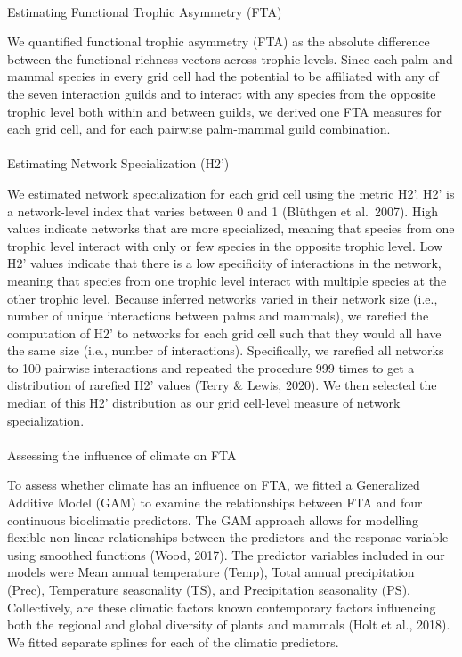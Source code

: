 \documentclass[
]{agujournal2019}
\makeatletter
\let\oldparagraph\paragraph
\renewcommand{\paragraph}{
    \@ifstar
      \xxxParagraphStar
      \xxxParagraphNoStar
  }
\newcommand{\xxxParagraphStar}[1]{\oldparagraph*{#1}\mbox{}}
\newcommand{\xxxParagraphNoStar}[1]{\oldparagraph{#1}\mbox{}}
\makeatother
\begin{document}
\paragraph{Estimating Functional Trophic Asymmetry
(FTA)}\label{estimating-functional-trophic-asymmetry-fta}

We quantified functional trophic asymmetry (FTA) as the absolute
difference between the functional richness vectors across trophic
levels. Since each palm and mammal species in every grid cell had the
potential to be affiliated with any of the seven interaction guilds and
to interact with any species from the opposite trophic level both within
and between guilds, we derived one FTA measures for each grid cell, and
for each pairwise palm-mammal guild combination.

\paragraph{Estimating Network Specialization
(H2')}\label{estimating-network-specialization-h2}

We estimated network specialization for each grid cell using the metric
H2'. H2' is a network-level index that varies between 0 and 1 (Blüthgen
et al.~2007). High values indicate networks that are more specialized,
meaning that species from one trophic level interact with only or few
species in the opposite trophic level. Low H2' values indicate that
there is a low specificity of interactions in the network, meaning that
species from one trophic level interact with multiple species at the
other trophic level. Because inferred networks varied in their network
size (i.e., number of unique interactions between palms and mammals), we
rarefied the computation of H2' to networks for each grid cell such that
they would all have the same size (i.e., number of interactions).
Specifically, we rarefied all networks to 100 pairwise interactions and
repeated the procedure 999 times to get a distribution of rarefied H2'
values (Terry \& Lewis, 2020). We then selected the median of this H2'
distribution as our grid cell-level measure of network specialization.

\paragraph{Assessing the influence of climate on
FTA}\label{assessing-the-influence-of-climate-on-fta}

To assess whether climate has an influence on FTA, we fitted a
Generalized Additive Model (GAM) to examine the relationships between
FTA and four continuous bioclimatic predictors. The GAM approach allows
for modelling flexible non-linear relationships between the predictors
and the response variable using smoothed functions (Wood, 2017). The
predictor variables included in our models were Mean annual temperature
(Temp), Total annual precipitation (Prec), Temperature seasonality (TS),
and Precipitation seasonality (PS). Collectively, are these climatic
factors known contemporary factors influencing both the regional and
global diversity of plants and mammals (Holt et al., 2018). We fitted
separate splines for each of the climatic predictors.
\end{document}
